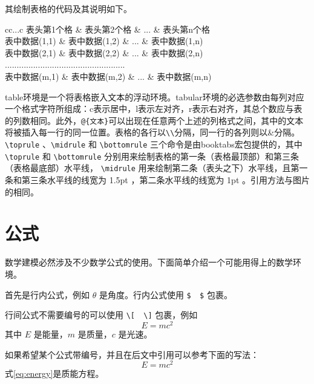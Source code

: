 \documentclass[withoutpreface,bwprint]{cumcmthesis}
\begin{document}
其绘制表格的代码及其说明如下。
\begin{tcode}
    \begin{table}[!htbp]
        \caption[标签名]{中文标题}
        \begin{tabular}{cc...c}
            \toprule[1.5pt]
            表头第1个格   & 表头第2个格   & ... & 表头第n个格  \\
            \midrule[1pt]
            表中数据(1,1) & 表中数据(1,2) & ... & 表中数据(1,n)\\
            表中数据(2,1) & 表中数据(2,2) & ... & 表中数据(2,n)\\
            ...................................................\\
            表中数据(m,1) & 表中数据(m,2) & ... & 表中数据(m,n)\\
            \bottomrule[1.5pt]
        \end{tabular}
    \end{table}
\end{tcode}

\bigskip

table环境是一个将表格嵌入文本的浮动环境。tabular环境的必选参数由每列对应一个格式字符所组成：c表示居中，l表示左对齐，r表示右对齐，其总个数应与表的列数相同。此外，\verb|@{文本}|可以出现在任意两个上述的列格式之间，其中的文本将被插入每一行的同一位置。表格的各行以\verb|\\|分隔，同一行的各列则以\&分隔。 \verb|\toprule| 、\verb|\midrule| 和 \verb|\bottomrule| 三个命令是由booktabs宏包提供的，其中 \verb|\toprule| 和 \verb|\bottomrule| 分别用来绘制表格的第一条（表格最顶部）和第三条（表格最底部）水平线， \verb|\midrule| 用来绘制第二条（表头之下）水平线，且第一条和第三条水平线的线宽为 1.5pt ，第二条水平线的线宽为 1pt 。引用方法与图片的相同。

\section{公式}

数学建模必然涉及不少数学公式的使用。下面简单介绍一个可能用得上的数学环境。

首先是行内公式，例如 $ \theta $ 是角度。行内公式使用 \verb|$  $| 包裹。

行间公式不需要编号的可以使用 \verb|\[  \]| 包裹，例如
\[
E=mc^2
\]
其中 $ E $ 是能量，$ m $ 是质量，$ c $ 是光速。

如果希望某个公式带编号，并且在后文中引用可以参考下面的写法：
\begin{equation}
E=mc^2
\label{eq:energy}
\end{equation}
式\cref{eq:energy}是质能方程。
\end{document}
